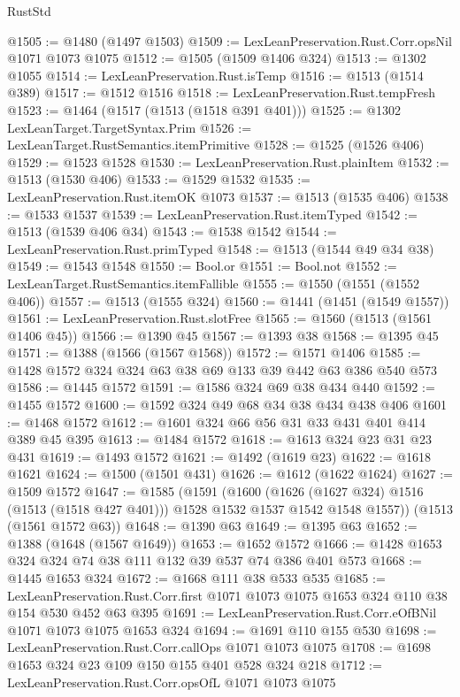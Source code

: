 \begin{lexlean}{RustStd}
\begin{coremodule}
@1505 := @1480 (@1497 @1503)
@1509 := LexLeanPreservation.Rust.Corr.opsNil @1071 @1073 @1075
@1512 := @1505 (@1509 @1406 @324)
@1513 := @1302 @1055
@1514 := LexLeanPreservation.Rust.isTemp
@1516 := @1513 (@1514 @389)
@1517 := @1512 @1516
@1518 := LexLeanPreservation.Rust.tempFresh
@1523 := @1464 (@1517 (@1513 (@1518 @391 @401)))
@1525 := @1302 LexLeanTarget.TargetSyntax.Prim
@1526 := LexLeanTarget.RustSemantics.itemPrimitive
@1528 := @1525 (@1526 @406)
@1529 := @1523 @1528
@1530 := LexLeanPreservation.Rust.plainItem
@1532 := @1513 (@1530 @406)
@1533 := @1529 @1532
@1535 := LexLeanPreservation.Rust.itemOK @1073
@1537 := @1513 (@1535 @406)
@1538 := @1533 @1537
@1539 := LexLeanPreservation.Rust.itemTyped
@1542 := @1513 (@1539 @406 @34)
@1543 := @1538 @1542
@1544 := LexLeanPreservation.Rust.primTyped
@1548 := @1513 (@1544 @49 @34 @38)
@1549 := @1543 @1548
@1550 := Bool.or
@1551 := Bool.not
@1552 := LexLeanTarget.RustSemantics.itemFallible
@1555 := @1550 (@1551 (@1552 @406))
@1557 := @1513 (@1555 @324)
@1560 := @1441 (@1451 (@1549 @1557))
@1561 := LexLeanPreservation.Rust.slotFree
@1565 := @1560 (@1513 (@1561 @1406 @45))
@1566 := @1390 @45
@1567 := @1393 @38
@1568 := @1395 @45
@1571 := @1388 (@1566 (@1567 @1568))
@1572 := @1571 @1406
@1585 := @1428 @1572 @324 @324 @63 @38 @69 @133 @39 @442 @63 @386 @540 @573
@1586 := @1445 @1572
@1591 := @1586 @324 @69 @38 @434 @440
@1592 := @1455 @1572
@1600 := @1592 @324 @49 @68 @34 @38 @434 @438 @406
@1601 := @1468 @1572
@1612 := @1601 @324 @66 @56 @31 @33 @431 @401 @414 @389 @45 @395
@1613 := @1484 @1572
@1618 := @1613 @324 @23 @31 @23 @431
@1619 := @1493 @1572
@1621 := @1492 (@1619 @23)
@1622 := @1618 @1621
@1624 := @1500 (@1501 @431)
@1626 := @1612 (@1622 @1624)
@1627 := @1509 @1572
@1647 := @1585
    (@1591
      (@1600
        (@1626 (@1627 @324) @1516 (@1513 (@1518 @427 @401)))
        @1528
        @1532
        @1537
        @1542
        @1548
        @1557))
    (@1513 (@1561 @1572 @63))
@1648 := @1390 @63
@1649 := @1395 @63
@1652 := @1388 (@1648 (@1567 @1649))
@1653 := @1652 @1572
@1666 := @1428 @1653 @324 @324 @74 @38 @111 @132 @39 @537 @74 @386 @401 @573
@1668 := @1445 @1653 @324
@1672 := @1668 @111 @38 @533 @535
@1685 := LexLeanPreservation.Rust.Corr.first
    @1071
    @1073
    @1075
    @1653
    @324
    @110
    @38
    @154
    @530
    @452
    @63
    @395
@1691 := LexLeanPreservation.Rust.Corr.eOfBNil @1071 @1073 @1075 @1653 @324
@1694 := @1691 @110 @155 @530
@1698 := LexLeanPreservation.Rust.Corr.callOps @1071 @1073 @1075
@1708 := @1698 @1653 @324 @23 @109 @150 @155 @401 @528 @324 @218
@1712 := LexLeanPreservation.Rust.Corr.opsOfL @1071 @1073 @1075

\end{coremodule}
\end{lexlean}

